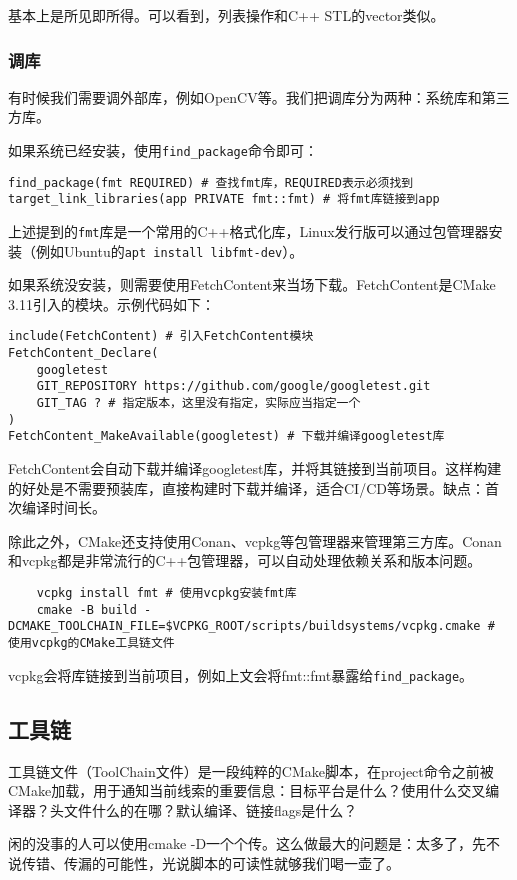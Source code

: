 基本上是所见即所得。可以看到，列表操作和C++ STL的vector类似。

\subsubsection{调库}

有时候我们需要调外部库，例如OpenCV等。我们把调库分为两种：系统库和第三方库。

如果系统已经安装，使用\texttt{find\_package}命令即可：
\begin{lstlisting}
find_package(fmt REQUIRED) # 查找fmt库，REQUIRED表示必须找到
target_link_libraries(app PRIVATE fmt::fmt) # 将fmt库链接到app
\end{lstlisting}
上述提到的\texttt{fmt}库是一个常用的C++格式化库，Linux发行版可以通过包管理器安装（例如Ubuntu的\texttt{apt install libfmt-dev}）。

如果系统没安装，则需要使用FetchContent来当场下载。FetchContent是CMake 3.11引入的模块。示例代码如下：
\begin{lstlisting}
include(FetchContent) # 引入FetchContent模块
FetchContent_Declare(
    googletest
    GIT_REPOSITORY https://github.com/google/googletest.git
    GIT_TAG ? # 指定版本，这里没有指定，实际应当指定一个
)
FetchContent_MakeAvailable(googletest) # 下载并编译googletest库
\end{lstlisting}
FetchContent会自动下载并编译googletest库，并将其链接到当前项目。这样构建的好处是不需要预装库，直接构建时下载并编译，适合CI/CD等场景。缺点：首次编译时间长。

除此之外，CMake还支持使用Conan、vcpkg等包管理器来管理第三方库。Conan和vcpkg都是非常流行的C++包管理器，可以自动处理依赖关系和版本问题。
\begin{lstlisting}
    vcpkg install fmt # 使用vcpkg安装fmt库
    cmake -B build -DCMAKE_TOOLCHAIN_FILE=$VCPKG_ROOT/scripts/buildsystems/vcpkg.cmake # 使用vcpkg的CMake工具链文件
\end{lstlisting}
vcpkg会将库链接到当前项目，例如上文会将fmt::fmt暴露给\texttt{find\_package}。

\subsection{工具链}

工具链文件（ToolChain文件）是一段纯粹的CMake脚本，在project命令之前被CMake加载，用于通知当前线索的重要信息：目标平台是什么？使用什么交叉编译器？头文件什么的在哪？默认编译、链接flags是什么？

闲的没事的人可以使用cmake -D一个个传。这么做最大的问题是：太多了，先不说传错、传漏的可能性，光说脚本的可读性就够我们喝一壶了。

